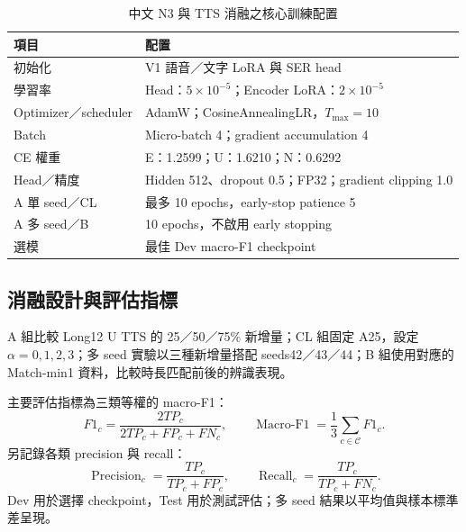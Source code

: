 \begin{table}[htbp]
\centering
\caption{中文 N3 與 TTS 消融之核心訓練配置}
\label{tab:training}
\small
\begin{tabularx}{\textwidth}{lX}
\toprule
項目 & 配置\\
\midrule
初始化 & V1 語音／文字 LoRA 與 SER head\\
學習率 & Head：$5\times10^{-5}$；Encoder LoRA：$2\times10^{-5}$\\
Optimizer／scheduler & AdamW；CosineAnnealingLR，$T_{\max}=10$\\
Batch & Micro-batch 4；gradient accumulation 4\\
CE 權重 & E：1.2599；U：1.6210；N：0.6292\\
Head／精度 & Hidden 512、dropout 0.5；FP32；gradient clipping 1.0\\
A 單 seed／CL & 最多 10 epochs，early-stop patience 5\\
A 多 seed／B & 10 epochs，不啟用 early stopping\\
選模 & 最佳 Dev macro-F1 checkpoint\\
\bottomrule
\end{tabularx}
\end{table}


\subsection{消融設計與評估指標}
A 組比較 Long12 U TTS 的 25／50／75\% 新增量；CL 組固定 A25，設定 $\alpha=0,1,2,3$；多 seed 實驗以三種新增量搭配 seeds42／43／44；B 組使用對應的 Match-min1 資料，比較時長匹配前後的辨識表現。


主要評估指標為三類等權的 macro-F1：
\begin{equation}
 F1_c=\frac{2TP_c}{2TP_c+FP_c+FN_c},\qquad
 \operatorname{Macro\text{-}F1}=\frac{1}{3}\sum_{c\in\mathcal C}F1_c.
 \label{eq:macrof1}
\end{equation}
另記錄各類 precision 與 recall：
\begin{equation}
 \operatorname{Precision}_c=\frac{TP_c}{TP_c+FP_c},\qquad
 \operatorname{Recall}_c=\frac{TP_c}{TP_c+FN_c}.
 \label{eq:precisionrecall}
\end{equation}
Dev 用於選擇 checkpoint，Test 用於測試評估；多 seed 結果以平均值與樣本標準差呈現。


